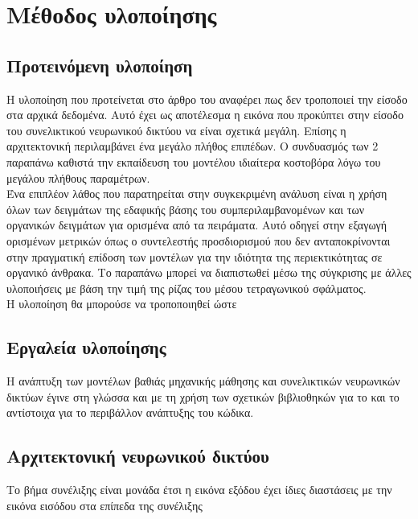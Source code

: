 \chapter{Μέθοδος υλοποίησης}
\label{ch:implementation_method}

\section{Προτεινόμενη υλοποίηση}
Η υλοποίηση που προτείνεται στο άρθρο του \cite{padarian_lucas_soil} αναφέρει πως δεν τροποποιεί την είσοδο στα αρχικά δεδομένα. Αυτό έχει ως αποτέλεσμα η εικόνα που προκύπτει στην είσοδο του συνελικτικού νευρωνικού δικτύου να είναι σχετικά μεγάλη. Επίσης η αρχιτεκτονική περιλαμβάνει ένα μεγάλο πλήθος επιπέδων. Ο συνδυασμός των 2 παραπάνω καθιστά την εκπαίδευση του μοντέλου ιδιαίτερα κοστοβόρα λόγω του μεγάλου πλήθους παραμέτρων.\\

Ένα επιπλέον λάθος που παρατηρείται στην συγκεκριμένη ανάλυση είναι η χρήση όλων των δειγμάτων της εδαφικής βάσης του  συμπεριλαμβανομένων και των οργανικών δειγμάτων για ορισμένα από τα πειράματα. Αυτό οδηγεί στην εξαγωγή ορισμένων μετρικών όπως ο συντελεστής προσδιορισμού που δεν ανταποκρίνονται στην πραγματική επίδοση των μοντέλων για την ιδιότητα της περιεκτικότητας σε οργανικό άνθρακα. Το παραπάνω μπορεί να διαπιστωθεί μέσω της σύγκρισης με άλλες υλοποιήσεις με βάση την τιμή της ρίζας του μέσου τετραγωνικού σφάλματος.\\

Η υλοποίηση θα μπορούσε να τροποποιηθεί ώστε 

\section{Εργαλεία υλοποίησης}
Η ανάπτυξη των μοντέλων βαθιάς μηχανικής μάθησης και συνελικτικών νευρωνικών δικτύων έγινε στη γλώσσα  και με τη χρήση των σχετικών βιβλιοθηκών  για το  και το  αντίστοιχα για το περιβάλλον ανάπτυξης του κώδικα.

\section{Αρχιτεκτονική νευρωνικού δικτύου}
Το βήμα συνέλιξης είναι μονάδα έτσι η εικόνα εξόδου έχει ίδιες διαστάσεις με την εικόνα εισόδου στα επίπεδα της συνέλιξης

